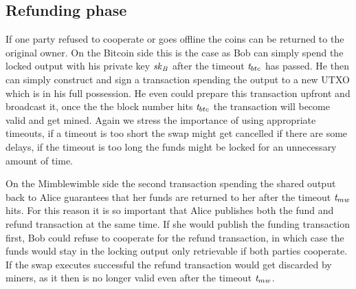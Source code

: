 \subsection{Refunding phase}\label{subsec:atom:refund}

If one party refused to cooperate or goes offline the coins can be returned to the original owner.
On the Bitcoin side this is the case as Bob can simply spend the locked output with his private key $\mathit{sk}_{\mathit{B}}$ after the timeout $\mathit{t}_{btc}$ has passed.
He then can simply construct and sign a transaction spending the output to a new UTXO which is in his full possession.
He even could prepare this transaction upfront and broadcast it, once the the block number hits $\mathit{t}_{btc}$ the transaction will become valid and get mined.
Again we stress the importance of using appropriate timeouts, if a timeout is too short the swap might get cancelled if there are some delays, if the timeout is too long the funds might be locked for an unnecessary amount of time.

On the Mimblewimble side the second transaction spending the shared output back to Alice guarantees that her funds are returned to her after the timeout $\mathit{t}_{mw}$ hits.
For this reason it is so important that Alice publishes both the fund and refund transaction at the same time.
If she would publish the funding transaction first, Bob could refuse to cooperate for the refund transaction, in which case the funds would stay in the locking output only retrievable if both parties cooperate.
If the swap executes successful the refund transaction would get discarded by miners, as it then is no longer valid even after the timeout $\mathit{t}_{mw}$.